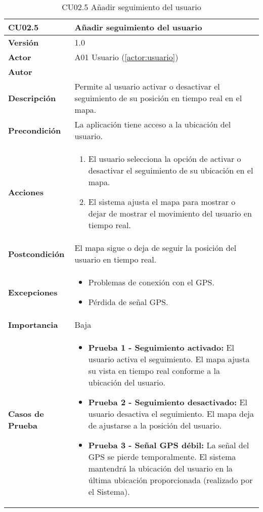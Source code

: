 \begin{table}[H]
	\centering
	\begin{tabularx}{\linewidth}{ p{} p{} }
		\toprule
		\textbf{CU02.5}    & \textbf{Añadir seguimiento del usuario} \\
		\toprule
		\textbf{Versión}              & 1.0    \\
		\textbf{Actor}                & A01 Usuario (\ref{actor:usuario}) \\
		\textbf{Autor}                & \autor \\
		\textbf{Descripción}          & Permite al usuario activar o desactivar el seguimiento de su posición en tiempo real en el mapa. \\
		\textbf{Precondición}         & La aplicación tiene acceso a la ubicación del usuario. \\
		\textbf{Acciones}             &
		\begin{enumerate}
			\def\labelenumi{\arabic{enumi}.}
			\tightlist
			\item El usuario selecciona la opción de activar o desactivar el seguimiento de su ubicación en el mapa.
			\item El sistema ajusta el mapa para mostrar o dejar de mostrar el movimiento del usuario en tiempo real.
		\end{enumerate}\\
		\textbf{Postcondición}        & El mapa sigue o deja de seguir la posición del usuario en tiempo real. \\
		\textbf{Excepciones}          & 
		\begin{itemize}
			\tightlist
			\item Problemas de conexión con el GPS.
			\item Pérdida de señal GPS.
		\end{itemize}\\
		\textbf{Importancia}          & Baja \\
		\textbf{Casos de Prueba}      &
		\begin{itemize}
			\item \textbf{Prueba 1 - Seguimiento activado:} El usuario activa el seguimiento. El mapa ajusta su vista en tiempo real conforme a la ubicación del usuario.
			\vspace{2pt}
			\item \textbf{Prueba 2 - Seguimiento desactivado:} El usuario desactiva el seguimiento. El mapa deja de ajustarse a la posición del usuario.
			\vspace{2pt}
			\item \textbf{Prueba 3 - Señal GPS débil:} La señal del GPS se pierde temporalmente. El sistema mantendrá la ubicación del usuario en la última ubicación proporcionada (realizado por el Sistema).
		\end{itemize} \\
		\bottomrule
	\end{tabularx}
	\caption{CU02.5 Añadir seguimiento del usuario}
	\label{cu:añadir-seguimiento}
\end{table}



